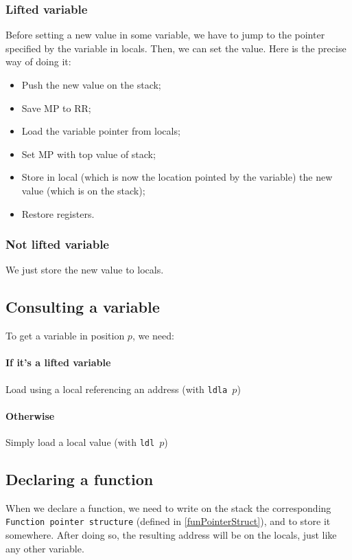 \documentclass{article}
\begin{document}
			\subsubsection{Lifted variable}
			Before setting a new value in some variable, we have to jump to the pointer specified by the variable in locals. Then, we can set the value. Here is the precise way of doing it:
			\begin{itemize}
				\item Push the new value on the stack;
				\item Save MP to RR;
				\item Load the variable pointer from locals;
				\item Set MP with top value of stack;
				\item Store in local (which is now the location pointed by the variable) the new value (which is on the stack);
				\item Restore registers.
			\end{itemize}
			\subsubsection{Not lifted variable}
				We just store the new value to locals.
		\subsection{Consulting a variable}
			To get a variable in position $p$, we need:
			\paragraph{If it's a lifted variable} Load using a local referencing an address (with \texttt{ldla $p$})
			\paragraph{Otherwise} Simply load a local value (with \texttt{ldl $p$})
		\subsection{Declaring a function}
			When we declare a function, we need to write on the stack the corresponding \texttt{Function pointer structure} (defined in \ref{funPointerStruct}), and to store it somewhere. After doing so, the resulting address will be on the locals, just like any other variable.
\end{document}
